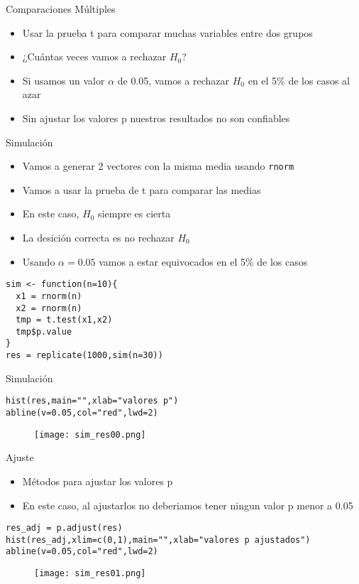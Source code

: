 \documentclass{beamer}
\begin{document}
\begin{frame}[fragile]{Comparaciones Múltiples}
\begin{itemize}
\item Usar la prueba t para comparar muchas variables entre dos grupos
\item ¿Cuántas veces vamos a rechazar $H_0$?
\item Si usamos un valor $\alpha$ de 0.05, vamos a rechazar $H_0$ en el 5\% de los casos al azar
\item Sin ajustar los valores p nuestros resultados no son confiables
\end{itemize}
\end{frame}

\begin{frame}[fragile]{Simulación}
\begin{itemize}
\item Vamos a generar 2 vectores con la misma media usando \verb=rnorm=
\item Vamos a usar la prueba de t para comparar las medias
\item En este caso, $H_0$ siempre es cierta
\item La desición correcta es no rechazar $H_0$
\item Usando $\alpha=0.05$ vamos a estar equivocados en el 5\% de los casos 
\end{itemize}
\begin{verbatim}
sim <- function(n=10){
  x1 = rnorm(n)
  x2 = rnorm(n)
  tmp = t.test(x1,x2)
  tmp$p.value
}
res = replicate(1000,sim(n=30))
\end{verbatim}
\end{frame}

\begin{frame}[fragile]{Simulación}
\begin{verbatim}
hist(res,main="",xlab="valores p")
abline(v=0.05,col="red",lwd=2)
\end{verbatim}
\begin{figure}
\centering
\texttt{[image: sim\_res00.png]}
\end{figure}
\end{frame}

\begin{frame}[fragile]{Ajuste}
\begin{itemize}
\item Métodos para ajustar los valores p
\item En este caso, al ajustarlos no deberiamos tener ningun valor p menor a 0.05
\end{itemize}
\begin{verbatim}
res_adj = p.adjust(res)
hist(res_adj,xlim=c(0,1),main="",xlab="valores p ajustados")
abline(v=0.05,col="red",lwd=2)
\end{verbatim}
\begin{figure}
\centering
\texttt{[image: sim\_res01.png]}
\end{figure}
\end{frame}
\end{document}
